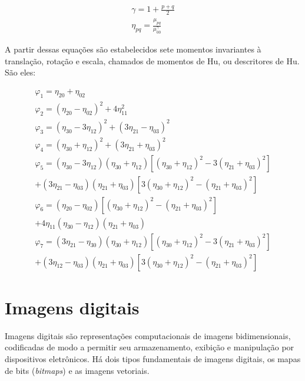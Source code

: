\begin{subequations}\label{eq:mm_norm}
\begin{align}
    \gamma = 1 + \frac{ p + q }{2} \\
    \eta_{pq} = \frac{ \mu_{pq} }{ \mu_{00}^\gamma }
\end{align}
\end{subequations}

A partir dessas equações são estabelecidos sete momentos invariantes à translação,
 rotação e escala, chamados de momentos de Hu, ou descritores de Hu. São eles:

\begin{subequations}\label{eq:mmt}
\begin{align}
  \varphi_1 = \eta_{20} + \eta_{02} \\
  \varphi_2 = (\eta_{20} - \eta_{02})^2 + 4\eta_{11}^2 \\
  \varphi_3 = (\eta_{30} - 3\eta_{12})^2 + (3\eta_{21} - \eta_{03})^2 \\
  \varphi_4 = (\eta_{30} + \eta_{12})^2 + (3\eta_{21} + \eta_{03})^2 \\
%
  \varphi_5 = (\eta_{30} - 3\eta_{12})(\eta_{30} + \eta_{12})
               \left[ (\eta_{30} + \eta_{12})^2 - 3(\eta_{21} + \eta_{03})^2 \right] \\
              + (3\eta_{21} - \eta_{03})(\eta_{21} + \eta_{03})
               \left[ 3(\eta_{30} + \eta_{12})^2 - (\eta_{21} + \eta_{03})^2 \right] \\
%
  \varphi_6 = (\eta_{20} - \eta_{02})
               \left[ (\eta_{30} + \eta_{12})^2 - (\eta_{21} + \eta_{03})^2 \right] \\
              + 4\eta_{11}(\eta_{30} - \eta_{12})(\eta_{21} + \eta_{03}) \\
%
  \varphi_7 = (3\eta_{21} - \eta_{30})(\eta_{30} + \eta_{12})
               \left[ (\eta_{30} + \eta_{12})^2 - 3(\eta_{21} + \eta_{03})^2 \right] \\
              + (3\eta_{12} - \eta_{03})(\eta_{21} + \eta_{03})
               \left[ 3(\eta_{30} + \eta_{12})^2 - (\eta_{21} + \eta_{03})^2 \right]
\end{align}
\end{subequations}

\section{Imagens digitais}\label{sec:img_dig}

Imagens digitais são representações computacionais de imagens bidimensionais,
codificadas de modo a permitir seu armazenamento, exibição e manipulação por
dispositivos eletrônicos. Há dois tipos fundamentais de imagens digitais,
os mapas de bits (\textit{bitmaps}) e as imagens vetoriais.

